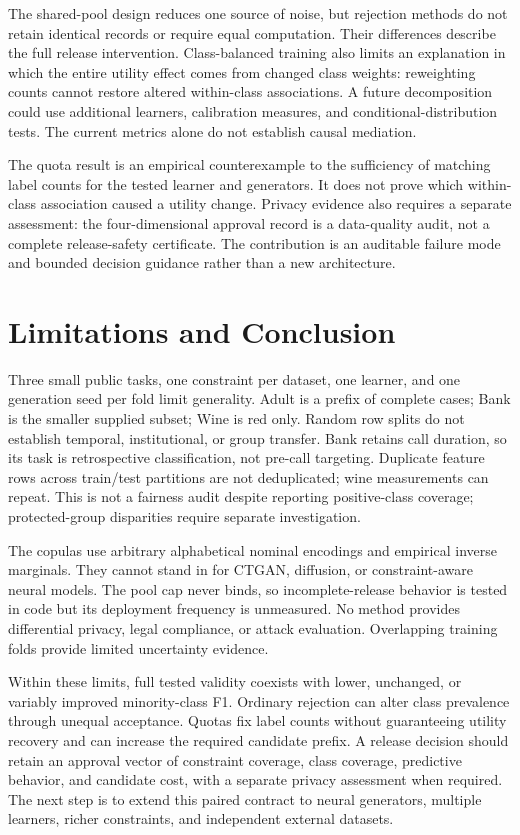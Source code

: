\documentclass{svproc}
\begin{document}
The shared-pool design reduces one source of noise, but rejection methods do not retain identical records or require equal computation. Their differences describe the full release intervention. Class-balanced training also limits an explanation in which the entire utility effect comes from changed class weights: reweighting counts cannot restore altered within-class associations. A future decomposition could use additional learners, calibration measures, and conditional-distribution tests. The current metrics alone do not establish causal mediation.

The quota result is an empirical counterexample to the sufficiency of matching label counts for the tested learner and generators. It does not prove which within-class association caused a utility change. Privacy evidence also requires a separate assessment: the four-dimensional approval record is a data-quality audit, not a complete release-safety certificate. The contribution is an auditable failure mode and bounded decision guidance rather than a new architecture.

\section{Limitations and Conclusion}
Three small public tasks, one constraint per dataset, one learner, and one generation seed per fold limit generality. Adult is a prefix of complete cases; Bank is the smaller supplied subset; Wine is red only. Random row splits do not establish temporal, institutional, or group transfer. Bank retains call duration, so its task is retrospective classification, not pre-call targeting. Duplicate feature rows across train/test partitions are not deduplicated; wine measurements can repeat. This is not a fairness audit despite reporting positive-class coverage; protected-group disparities require separate investigation.

The copulas use arbitrary alphabetical nominal encodings and empirical inverse marginals. They cannot stand in for CTGAN, diffusion, or constraint-aware neural models. The pool cap never binds, so incomplete-release behavior is tested in code but its deployment frequency is unmeasured. No method provides differential privacy, legal compliance, or attack evaluation. Overlapping training folds provide limited uncertainty evidence.

Within these limits, full tested validity coexists with lower, unchanged, or variably improved minority-class F1. Ordinary rejection can alter class prevalence through unequal acceptance. Quotas fix label counts without guaranteeing utility recovery and can increase the required candidate prefix. A release decision should retain an approval vector of constraint coverage, class coverage, predictive behavior, and candidate cost, with a separate privacy assessment when required. The next step is to extend this paired contract to neural generators, multiple learners, richer constraints, and independent external datasets.
\end{document}
